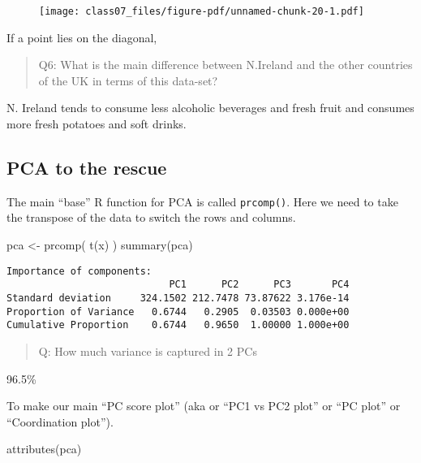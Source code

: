 \documentclass[
  letterpaper,
  DIV=11,
  numbers=noendperiod]{scrartcl}
\newenvironment{Shaded}{\begin{snugshade}}{\end{snugshade}}
\newcommand{\FunctionTok}[1]{\textcolor[rgb]{0.28,0.35,0.67}{#1}}
\newcommand{\NormalTok}[1]{\textcolor[rgb]{0.00,0.23,0.31}{#1}}
\newcommand{\OtherTok}[1]{\textcolor[rgb]{0.00,0.23,0.31}{#1}}
\begin{document}
\begin{figure}[H]

{\centering \texttt{[image: class07\_files/figure-pdf/unnamed-chunk-20-1.pdf]}

}

\end{figure}

If a point lies on the diagonal,

\begin{quote}
Q6: What is the main difference between N.Ireland and the other
countries of the UK in terms of this data-set?
\end{quote}

N. Ireland tends to consume less alcoholic beverages and fresh fruit and
consumes more fresh potatoes and soft drinks.

\hypertarget{pca-to-the-rescue}{%
\subsection{PCA to the rescue}\label{pca-to-the-rescue}}

The main ``base'' R function for PCA is called \texttt{prcomp()}. Here
we need to take the transpose of the data to switch the rows and
columns.

\begin{Shaded}
\begin{Highlighting}[]
\NormalTok{pca }\OtherTok{\textless{}{-}} \FunctionTok{prcomp}\NormalTok{( }\FunctionTok{t}\NormalTok{(x) )}
\FunctionTok{summary}\NormalTok{(pca)}
\end{Highlighting}
\end{Shaded}

\begin{verbatim}
Importance of components:
                            PC1      PC2      PC3       PC4
Standard deviation     324.1502 212.7478 73.87622 3.176e-14
Proportion of Variance   0.6744   0.2905  0.03503 0.000e+00
Cumulative Proportion    0.6744   0.9650  1.00000 1.000e+00
\end{verbatim}

\begin{quote}
Q: How much variance is captured in 2 PCs
\end{quote}

96.5\%

To make our main ``PC score plot'' (aka or ``PC1 vs PC2 plot'' or ``PC
plot'' or ``Coordination plot'').

\begin{Shaded}
\begin{Highlighting}[]
\FunctionTok{attributes}\NormalTok{(pca) }
\end{Highlighting}
\end{Shaded}
\end{document}
